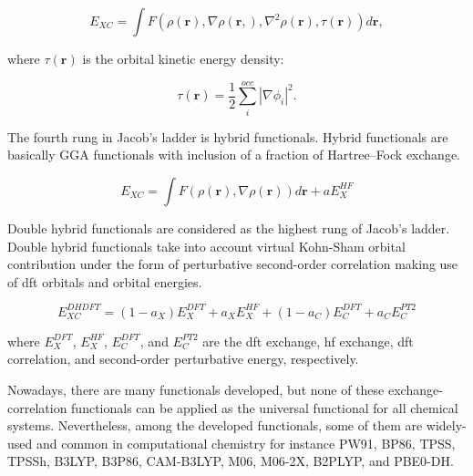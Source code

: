 \begin{refsection}
\begin{equation}
	E_{XC} = \int F(\rho(\mathbf{r}),\nabla\rho(\mathbf{r},), \nabla^2\rho(\mathbf{r}),\tau(\mathbf{r}))d\mathbf{r},
\end{equation}

\noindent where $\tau(\mathbf{r})$ is the orbital kinetic energy density:

\begin{equation}
	\tau(\mathbf{r}) = \frac{1}{2}\sum_{i}^{occ}\left|\nabla\phi_i\right|^2.
\end{equation}

\noindent The fourth rung in Jacob's ladder is hybrid functionals. Hybrid functionals are basically GGA functionals with inclusion of a fraction of Hartree–Fock exchange.


\begin{equation}
	E_{XC} = \int F(\rho(\mathbf{r}),\nabla\rho(\mathbf{r}))d\mathbf{r} + aE_X^{HF}
\end{equation}


\noindent Double hybrid functionals are considered as the highest rung of Jacob's ladder. Double hybrid functionals take into account virtual Kohn-Sham orbital contribution under the form of perturbative second-order correlation making use of \acrshort{dft} orbitals and orbital energies. \cite{c2:dh1, c2:dh2} 

\begin{equation}
	E_{XC}^{DHDFT} = (1-a_X)E_X^{DFT} + a_XE_X^{HF} + (1-a_C)E_C^{DFT} + a_CE_C^{PT2}
\end{equation}

\noindent where $E_X^{DFT}$, $E_X^{HF}$, $E_C^{DFT}$, and $E_C^{PT2}$ are the \acrshort{dft} exchange, \acrshort{hf} exchange, \acrshort{dft} correlation, and second-order perturbative energy, respectively.


Nowadays, there are many functionals developed, but none of these exchange-correlation functionals can be applied as the universal functional for all chemical systems. Nevertheless, among the developed functionals, some of them are widely-used and common  in computational chemistry for instance PW91, BP86, TPSS, TPSSh, B3LYP, B3P86, CAM-B3LYP, M06, M06-2X, B2PLYP, and PBE0-DH. 




\printbibliography[heading=subbibliography] %

\end{refsection}
